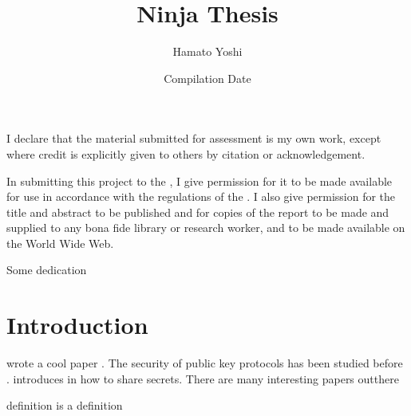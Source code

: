 \documentclass[final]{sta-thesis}
\title{Ninja Thesis}
\author{Hamato Yoshi}
\date{Compilation Date}
\begin{document}
\maketitle 
\frontmatter
\thispagestyle{empty}
\begin{abstract}

\end{abstract}
\newpage
\begin{declaration}
I declare that the material submitted for assessment is my own work,
except where credit is explicitly given to others by citation or
acknowledgement.
\end{declaration}

\begin{copyrightnotice}
In submitting this project to the \emph{\theuniversity}, I give
permission for it to be made available for use in accordance with the
regulations of the \emph{\theuniversity}. I also give permission for
the title and abstract to be published and for copies of the report to
be made and supplied to any bona fide library or research worker, and
to be made available on the World Wide Web. 
\end{copyrightnotice}

\begin{dedication}
Some dedication
\end{dedication}

\tableofcontents

\mainmatter

\chapter{Introduction}
\nocite{*}
\citeauthor{Shannon1946} wrote a cool paper \citep{Shannon1946}. The security of public key protocols has been studied before \citep{Dolev1983}. \citeauthor{Shamir1979} introduces in \citet{Shamir1979} how to share secrets.
There are many interesting papers outthere \cite{Needham1978,Rivest1978,Merkle1978,Diffie1976,Shannon1949,Ziv1977, Huffman1952, Hamming1950}

\begin{definition}[A definition]
definition is a definition
\end{definition}
\end{document}
